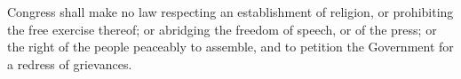 
\par Congress shall make no law respecting an establishment of religion, or prohibiting the free exercise thereof; or abridging the freedom of speech, or of the press; or the right of the people peaceably to assemble, and to petition the Government for a redress of grievances. 